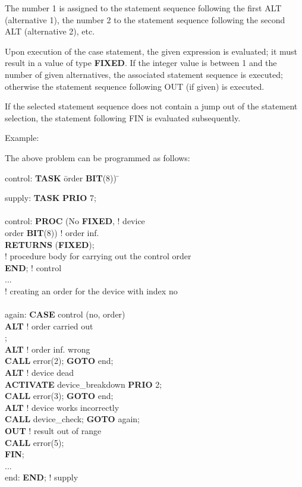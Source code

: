 The number 1 is assigned to the statement sequence following the first
ALT (alternative 1), the number 2 to the statement sequence following
the second ALT (alternative 2), etc.

Upon execution of the case statement, the given expression is
evaluated; it must result in a value of type {\bf FIXED}. If the integer value
is between 1 and the number of given alternatives, the associated
statement sequence is executed; otherwise the statement sequence
following OUT (if given) is executed.

If the selected statement sequence does not contain a jump out of the
statement selection, the statement following FIN is evaluated
subsequently.

Example:

The above problem can be programmed as follows:

\begin{tabbing}

control: \= {\bf TASK} \= order {\bf BIT}(8)) \x \= \kill

supply:  \> {\bf TASK} \> {\bf PRIO} 7;       \> \\
 \> \> \> \\
control: \> {\bf PROC} \> (No {\bf FIXED},    \> ! device \\
 \>             \> order {\bf BIT}(8)) \> ! order inf.\\
 \> {\bf RETURNS} ({\bf FIXED});   \>  \> \\
 \> ! procedure body for carrying out the control order \> \> \\
 \> {\bf END}; ! control \> \> \\
 \> ... \> \> \\
 \> ! creating an order for the device with index no \> \> \\
 \> \> \> \\
again:   \> {\bf CASE} \> control (no, order) \> \\
 \> {\bf ALT}   \> ! order carried out \> \\
 \>             \> ; \> \\
 \> {\bf ALT}   \> ! order inf. wrong \> \\
 \>             \> {\bf CALL} error(2); {\bf GOTO} end; \> \\
 \> {\bf ALT}   \> ! device dead \> \\
 \>             \> {\bf ACTIVATE} device\_breakdown {\bf PRIO} 2; \> \\
 \>             \> {\bf CALL} error(3); {\bf GOTO} end; \> \\
 \> {\bf ALT}   \> ! device works incorrectly \> \\
 \>             \> {\bf CALL} device\_check; {\bf GOTO} again; \> \\
 \> {\bf OUT}   \> ! result out of range \> \\
 \>             \> {\bf CALL} error(5); \> \\
 \> {\bf FIN}; \> \> \\
 \> ...         \> \> \\
end:     \> {\bf END}; \> ! supply \>
\end{tabbing}


